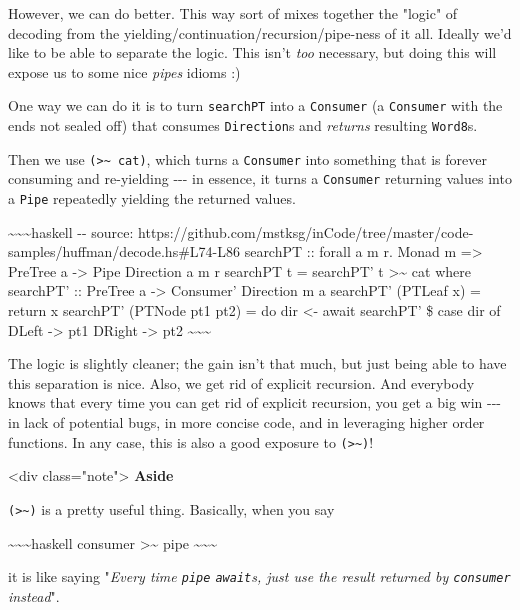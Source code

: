 \documentclass[]{article}
\begin{document}
However, we can do better. This way sort of mixes together the "logic" of
decoding from the yielding/continuation/recursion/pipe-ness of it all. Ideally
we'd like to be able to separate the logic. This isn't \emph{too} necessary, but
doing this will expose us to some nice \emph{pipes} idioms :)

One way we can do it is to turn \texttt{searchPT} into a
\texttt{Consumer\textquotesingle{}} (a \texttt{Consumer} with the ends not
sealed off) that consumes \texttt{Direction}s and \emph{returns} resulting
\texttt{Word8}s.

Then we use \texttt{(\textgreater{}\textasciitilde{}\ cat)}, which turns a
\texttt{Consumer\textquotesingle{}} into something that is forever consuming and
re-yielding -\/-\/- in essence, it turns a \texttt{Consumer\textquotesingle{}}
returning values into a \texttt{Pipe} repeatedly yielding the returned values.

\textasciitilde{}\textasciitilde{}\textasciitilde{}haskell -\/- source:
https://github.com/mstksg/inCode/tree/master/code-samples/huffman/decode.hs\#L74-L86
searchPT :: forall a m r. Monad m =\textgreater{} PreTree a -\textgreater{} Pipe
Direction a m r searchPT t = searchPT' t \textgreater{}\textasciitilde{} cat
where searchPT' :: PreTree a -\textgreater{} Consumer' Direction m a searchPT'
(PTLeaf x) = return x searchPT' (PTNode pt1 pt2) = do dir \textless{}- await
searchPT' \$ case dir of DLeft -\textgreater{} pt1 DRight -\textgreater{} pt2
\textasciitilde{}\textasciitilde{}\textasciitilde{}

The logic is slightly cleaner; the gain isn't that much, but just being able to
have this separation is nice. Also, we get rid of explicit recursion. And
everybody knows that every time you can get rid of explicit recursion, you get a
big win -\/-\/- in lack of potential bugs, in more concise code, and in
leveraging higher order functions. In any case, this is also a good exposure to
\texttt{(\textgreater{}\textasciitilde{})}!

\textless{}div class="note"\textgreater{} \textbf{Aside}

\texttt{(\textgreater{}\textasciitilde{})} is a pretty useful thing. Basically,
when you say

\textasciitilde{}\textasciitilde{}\textasciitilde{}haskell consumer
\textgreater{}\textasciitilde{} pipe
\textasciitilde{}\textasciitilde{}\textasciitilde{}

it is like saying "\emph{Every time \texttt{pipe} \texttt{await}s, just use the
result returned by \texttt{consumer} instead}".
\end{document}
